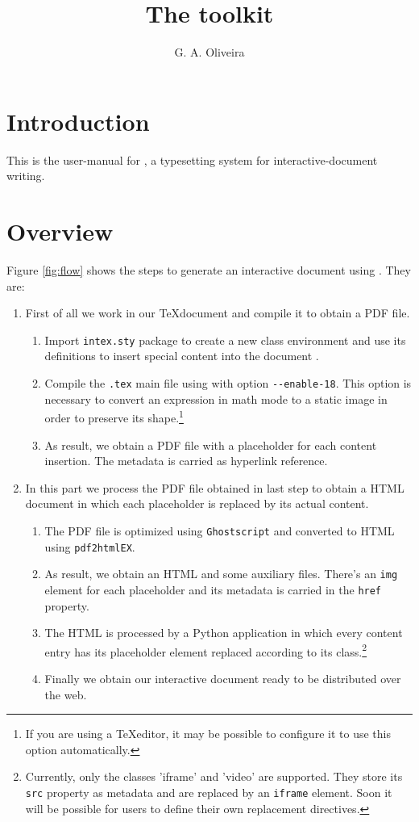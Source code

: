 \documentclass[10pt,a4paper]{article}
\author{G. A. Oliveira}
\title{The \intexs toolkit}
\begin{document}
\maketitle
\section{Introduction}
This is the user-manual for \intex, a typesetting system for interactive-document writing.
\section{Overview}
Figure \ref{fig:flow} shows the steps to generate an interactive document using \intex. They are:
\begin{enumerate}[label*=\arabic*.]
	\item First of all we work in our \TeX\space document and compile it to obtain a PDF file.
	\begin{enumerate}[label*=\arabic*.]
		\item Import \verb|intex.sty| package to create a new class environment and use its definitions to insert special content into the document .
		\item Compile the \verb|.tex| main file using  with option \verb|--enable-18|. This option is necessary to convert an expression in math mode to a static image in order to preserve its shape.\footnote{If you are using a \TeX\space editor, it may be possible to configure it to use this option automatically.}
		\item As result, we obtain a PDF file with a placeholder for each content insertion. The metadata is carried as hyperlink reference.
	\end{enumerate}
	\item In this part we process the PDF file obtained in last step to obtain a HTML document in which each placeholder is replaced by its actual content.
	\begin{enumerate}[label*=\arabic*.]
		\item The PDF file is optimized using \verb|Ghostscript| and converted to HTML using \verb|pdf2htmlEX|.
		\item As result, we obtain an HTML and some auxiliary files. There's an \verb|img| element for each placeholder and its metadata is carried in the \verb|href| property.
		\item The HTML is processed by a Python application in which every content entry has its placeholder element replaced according to its class.\footnote{Currently, only the classes 'iframe' and 'video' are supported. They store its \verb|src| property as metadata and are replaced by an \verb|iframe| element. Soon it will be possible for users to define their own replacement directives.}
		\item Finally we obtain our interactive document ready to be distributed over the web.
	\end{enumerate}
\end{enumerate}
\end{document}
